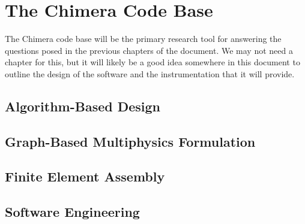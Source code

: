 \chapter{The Chimera Code Base}
\label{ch:chimera_codebase}

The Chimera code base will be the primary research tool for answering
the questions posed in the previous chapters of the document. We may
not need a chapter for this, but it will likely be a good idea
somewhere in this document to outline the design of the software and
the instrumentation that it will provide.

\section{Algorithm-Based Design}
\label{ch:chimera_design}

\section{Graph-Based Multiphysics Formulation}
\label{ch:multiphysics_graph}

\section{Finite Element Assembly}
\label{ch:fem_assembly}

\section{Software Engineering}
\label{ch:software_engineering}
